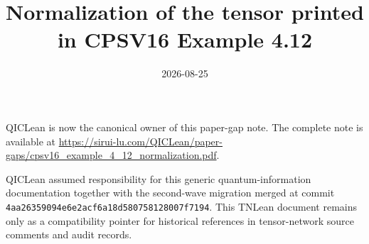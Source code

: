 \documentclass{article}
\title{Normalization of the tensor printed in CPSV16 Example 4.12}
\author{}
\date{2026-08-25}
\begin{document}
\maketitle
{}

QICLean is now the canonical owner of this paper-gap note. The complete note is
available at
\url{https://sirui-lu.com/QICLean/paper-gaps/cpsv16_example_4_12_normalization.pdf}.

QICLean assumed responsibility for this generic quantum-information
documentation together with the second-wave migration merged at commit
\texttt{4aa26359094e6e2acf6a18d580758128007f7194}. This TNLean document remains
only as a compatibility pointer for historical references in tensor-network
source comments and audit records.
\end{document}
